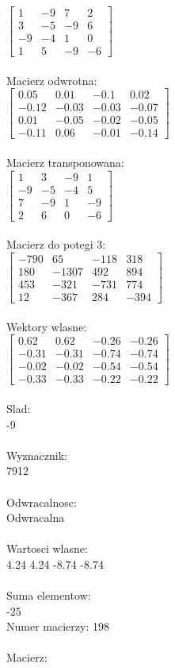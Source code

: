 \documentclass[a4paper,12pt]{article}
\begin{document}
$\begin{bmatrix} 1&-9&7&2\\3&-5&-9&6\\-9&-4&1&0\\1&5&-9&-6 \end{bmatrix}$
\\
\\
Macierz odwrotna:\\

$\begin{bmatrix} 0.05&0.01&-0.1&0.02\\-0.12&-0.03&-0.03&-0.07\\0.01&-0.05&-0.02&-0.05\\-0.11&0.06&-0.01&-0.14 \end{bmatrix}$
\\
\\
Macierz transponowana:\\

$\begin{bmatrix} 1&3&-9&1\\-9&-5&-4&5\\7&-9&1&-9\\2&6&0&-6 \end{bmatrix}$
\\
\\
Macierz do potegi 3:\\

$\begin{bmatrix} -790&65&-118&318\\180&-1307&492&894\\453&-321&-731&774\\12&-367&284&-394 \end{bmatrix}$
\\
\\
Wektory wlasne:\\

$\begin{bmatrix} 0.62&0.62&-0.26&-0.26\\-0.31&-0.31&-0.74&-0.74\\-0.02&-0.02&-0.54&-0.54\\-0.33&-0.33&-0.22&-0.22 \end{bmatrix}$
\\
\\
Slad:\\
-9
\\
\\
Wyznacznik:\\
7912
\\
\\
Odwracalnosc:\\
Odwracalna
\\
\\
Wartosci wlasne:\\
4.24 4.24 -8.74 -8.74
\\
\\
Suma elementow:\\
-25
\\
\newpage
Numer macierzy:
198
\\
\\
Macierz:\\
\end{document}
